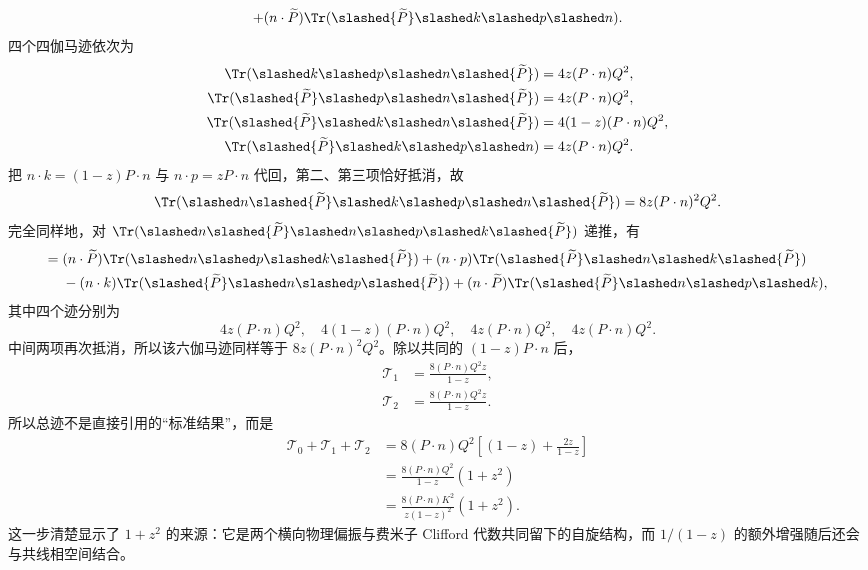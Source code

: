 \begin{derivation}
\begin{align*}
+(n\cdot\widetilde P)\Tr(\slashed{\widetilde P}\slashed k\slashed p\slashed n).
\end{align*}
四个四伽马迹依次为
\begin{align*}
\Tr(\slashed k\slashed p\slashed n\slashed{\widetilde P})&=4z(P\cdot n)Q^2,\\
\Tr(\slashed{\widetilde P}\slashed p\slashed n\slashed{\widetilde P})&=4z(P\cdot n)Q^2,\\
\Tr(\slashed{\widetilde P}\slashed k\slashed n\slashed{\widetilde P})&=4(1-z)(P\cdot n)Q^2,\\
\Tr(\slashed{\widetilde P}\slashed k\slashed p\slashed n)&=4z(P\cdot n)Q^2.
\end{align*}
把 $n\cdot k=(1-z)P\cdot n$ 与 $n\cdot p=zP\cdot n$ 代回，第二、第三项恰好抵消，故
\begin{equation*}
\Tr(\slashed n\slashed{\widetilde P}\slashed k\slashed p
\slashed n\slashed{\widetilde P})
=8z(P\cdot n)^2Q^2.
\end{equation*}
完全同样地，对
\(\Tr(\slashed n\slashed{\widetilde P}\slashed n\slashed p
\slashed k\slashed{\widetilde P})\) 递推，有
\begin{align*}
={}&(n\cdot\widetilde P)\Tr(\slashed n\slashed p\slashed k\slashed{\widetilde P})
+(n\cdot p)\Tr(\slashed{\widetilde P}\slashed n\slashed k\slashed{\widetilde P})\\
&-(n\cdot k)\Tr(\slashed{\widetilde P}\slashed n\slashed p\slashed{\widetilde P})
+(n\cdot\widetilde P)\Tr(\slashed{\widetilde P}\slashed n\slashed p\slashed k),
\end{align*}
其中四个迹分别为
\begin{equation*}
4z(P\cdot n)Q^2,
\quad4(1-z)(P\cdot n)Q^2,
\quad4z(P\cdot n)Q^2,
\quad4z(P\cdot n)Q^2.
\end{equation*}
中间两项再次抵消，所以该六伽马迹同样等于
\(8z(P\cdot n)^2Q^2\)。除以共同的
$(1-z)P\cdot n$ 后，
\begin{align*}
\mathcal T_1
&=\frac{8(P\cdot n)Q^2z}{1-z},\\
\mathcal T_2
&=\frac{8(P\cdot n)Q^2z}{1-z}.
\end{align*}
所以总迹不是直接引用的“标准结果”，而是
\begin{align*}
\mathcal T_0+\mathcal T_1+\mathcal T_2
&=8(P\cdot n)Q^2
\left[(1-z)+\frac{2z}{1-z}\right]\\
&=\frac{8(P\cdot n)Q^2}{1-z}(1+z^2)\\
&=\frac{8(P\cdot n)K^2}{z(1-z)^2}(1+z^2).
\end{align*}
这一步清楚显示了 $1+z^2$ 的来源：它是两个横向物理偏振与费米子 Clifford 代数共同留下的自旋结构，而 $1/(1-z)$ 的额外增强随后还会与共线相空间结合。


\end{derivation}
